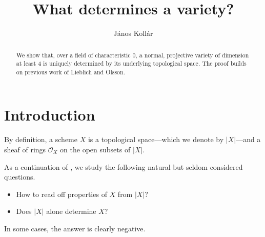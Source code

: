 \documentclass{amsart}
\theoremstyle{definition}
\theoremstyle{remark}
\renewcommand{\o}[0]{{\mathcal O}}
\begin{document}





 \title{What determines a variety?}
\author{J\'anos Koll\'ar}
\begin{abstract}
We show that, over a field of characteristic 0,  a normal, projective variety of dimension at least 4
 is uniquely determined by its underlying topological space. 
The proof builds on previous work of Lieblich and Olsson. 
\end{abstract}

 \maketitle


\tableofcontents





\section{Introduction}




By definition, a  scheme $X$ is a topological space---which we denote by $|X|$---and a sheaf of rings  $\o_X$  on the open subsets of $|X|$. 

As a continuation of \cite{k-lo, k-lo-2},
we study the following  natural but seldom considered questions. 
\begin{itemize}
\item How to read off properties of $X$ from $|X|$?
\item Does $|X|$ alone determine $X$?
\end{itemize}


In some cases, the answer is clearly negative.
\end{document}
